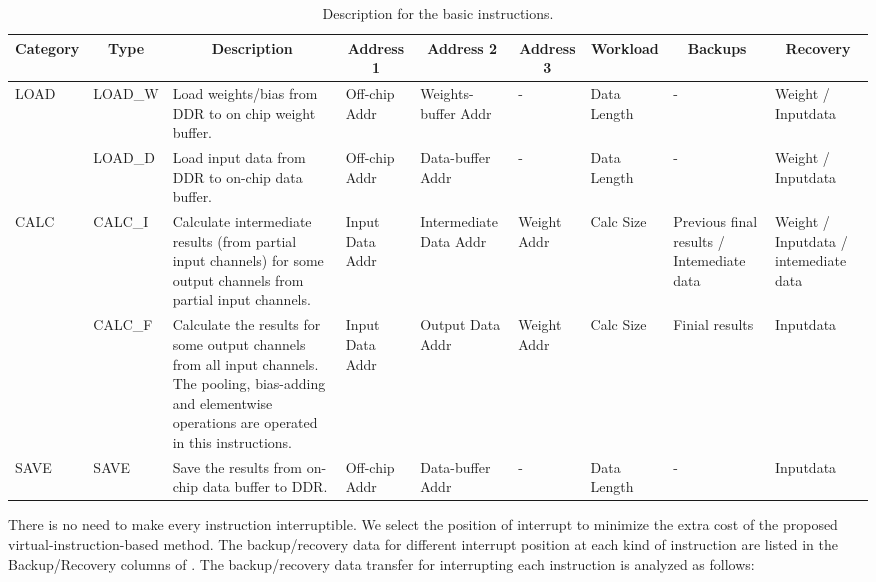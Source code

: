 \begin{table}[t]
	\footnotesize
	\centering
	\caption{Description for the basic instructions.}
\begin{tabular}{|p{2.7em}|p{3.4em}|p{16em}|p{4.2em}|p{4.6em}|p{4.2em}|p{4.2em}||p{7em}|p{7em}|}
	\hline
	\multicolumn{1}{|c|}{Category} & \multicolumn{1}{c|}{Type} & \multicolumn{1}{c|}{Description} & \multicolumn{1}{c|}{Address 1} & \multicolumn{1}{c|}{Address 2} & \multicolumn{1}{c|}{Address 3} & \multicolumn{1}{c||}{Workload} & \multicolumn{1}{c|}{Backups} & \multicolumn{1}{c|}{Recovery} \bigstrut\\
	\hline
	\multirow{2}[4]{*}{LOAD} & LOAD\_W & Load weights/bias from DDR to on chip weight buffer. & Off-chip Addr & Weights-buffer Addr & -     & Data  Length & -     & Weight / Inputdata \bigstrut\\
	\cline{2-9}\multicolumn{1}{|c|}{} & LOAD\_D & Load input data from DDR to on-chip data buffer. & Off-chip Addr & Data-buffer Addr & -     & Data  Length & -     & Weight / Inputdata \bigstrut\\
	\hline
	\multirow{2}[4]{*}{CALC} & CALC\_I & Calculate intermediate results (from partial input channels) for some output channels from partial  input channels. & Input  Data Addr & Intermediate Data Addr & Weight Addr & Calc Size & Previous final results / Intemediate data  & Weight / Inputdata /  intemediate data \bigstrut\\
	\cline{2-9}\multicolumn{1}{|c|}{} & CALC\_F & Calculate the results for some output channels from all input channels. The pooling, bias-adding and elementwise operations are operated in this instructions. & Input  Data Addr & Output  Data Addr & Weight Addr & Calc Size & Finial results & Inputdata \bigstrut\\
	\hline
	SAVE  & SAVE  & Save the results from on-chip data buffer to DDR. & Off-chip Addr & Data-buffer Addr & -     & Data  Length & -     & Inputdata \bigstrut\\
	\hline
	\end{tabular}%
	
	\label{tab:instr}%
  \end{table}%

There is no need to make every instruction interruptible. We select the position of interrupt to minimize the extra cost of the proposed virtual-instruction-based method. The backup/recovery data for different interrupt position at each kind of instruction are listed in the Backup/Recovery columns of . The backup/recovery data transfer for interrupting each instruction is analyzed as follows:


